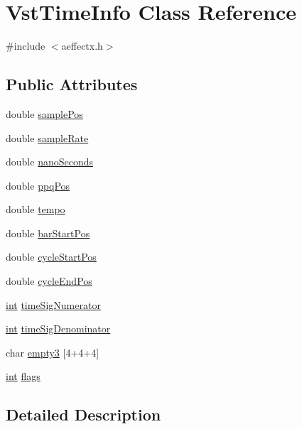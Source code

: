 \hypertarget{class_vst_time_info}{}\section{Vst\+Time\+Info Class Reference}
\label{class_vst_time_info}


{\ttfamily \#include $<$aeffectx.\+h$>$}

\subsection*{Public Attributes}
\begin{DoxyCompactItemize}
\item 
double \hyperlink{class_vst_time_info_ad46fad394f437e1b283f2e36285be146}{sample\+Pos}
\item 
double \hyperlink{class_vst_time_info_a4eeabf8718165724415405006df7f445}{sample\+Rate}
\item 
double \hyperlink{class_vst_time_info_a752a9e10bb6ad422cccef03999b5ba33}{nano\+Seconds}
\item 
double \hyperlink{class_vst_time_info_aa243da6be1161a971983e68be39e7a28}{ppq\+Pos}
\item 
double \hyperlink{class_vst_time_info_a239c72a382d14e54df88db80f164f368}{tempo}
\item 
double \hyperlink{class_vst_time_info_a52d38a95a4c34ea3fb060388d4b412d2}{bar\+Start\+Pos}
\item 
double \hyperlink{class_vst_time_info_a8cc34ec2d43a1cd5d86f2182373e9d9e}{cycle\+Start\+Pos}
\item 
double \hyperlink{class_vst_time_info_a518833deeff87f9fbf8d0507a646470f}{cycle\+End\+Pos}
\item 
\hyperlink{xmltok_8h_a5a0d4a5641ce434f1d23533f2b2e6653}{int} \hyperlink{class_vst_time_info_aea61c510ba02eb75996b61f088f727b1}{time\+Sig\+Numerator}
\item 
\hyperlink{xmltok_8h_a5a0d4a5641ce434f1d23533f2b2e6653}{int} \hyperlink{class_vst_time_info_a981a0fd6aaa107fa3d6ffb62ced70f35}{time\+Sig\+Denominator}
\item 
char \hyperlink{class_vst_time_info_a74751107dc94ab06330e11b25f3bac28}{empty3} \mbox{[}4+4+4\mbox{]}
\item 
\hyperlink{xmltok_8h_a5a0d4a5641ce434f1d23533f2b2e6653}{int} \hyperlink{class_vst_time_info_a23651d946de653bb35899da6b781b8c5}{flags}
\end{DoxyCompactItemize}


\subsection{Detailed Description}


